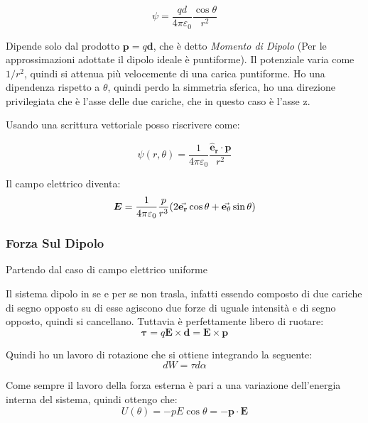 \documentclass[a4paper]{scrarticle}
\begin{document}
\begin{equation}
    \psi = \frac{qd}{4\pi\varepsilon_0}\frac{\cos\theta}{r^2}
\end{equation}

Dipende solo dal prodotto $\bm p = q \bm d$, che è detto \emph{Momento di Dipolo} (Per le approssimazioni adottate il dipolo ideale è puntiforme).
Il potenziale varia come $1/r^2$, quindi si attenua più velocemente di una carica puntiforme.
Ho una dipendenza rispetto a $\theta$, quindi perdo la simmetria sferica, ho una direzione privilegiata che è l'asse delle due cariche, che in questo caso è l'asse z.

Usando una scrittura vettoriale posso riscrivere come:

\begin{equation}
    \psi(r, \theta) = \frac{1}{4 \pi \varepsilon_0} \frac{\bm{\hat e_r} \cdot \bm p}{r^2}
\end{equation}

Il campo elettrico diventa:
\begin{equation}
    \bm E = \frac{1}{4\pi\varepsilon_0} \frac{p}{r^3} (2 \va{ e_r}\cos \theta + \va{ e_\theta} \sin\theta )
\end{equation}

\subsubsection*{Forza Sul Dipolo}

Partendo dal caso di campo elettrico uniforme

Il sistema dipolo in se e per se non trasla, infatti essendo composto di due cariche di segno opposto su di esse agiscono due forze di uguale intensità e di segno opposto, quindi si cancellano. Tuttavia è perfettamente libero di ruotare:
\begin{equation}
    \bm \tau = q \bm E \times \bm d = \bm E \times \bm p
\end{equation}

Quindi ho un lavoro di rotazione che si ottiene integrando la seguente:
\begin{equation*}
    dW = \tau d\alpha
\end{equation*}

Come sempre il lavoro della forza esterna è pari a una variazione dell'energia interna del sistema, quindi ottengo che:
\begin{equation*}
    U(\theta) = -pE\cos \theta = - \bm p \cdot \bm E
\end{equation*}
\end{document}
